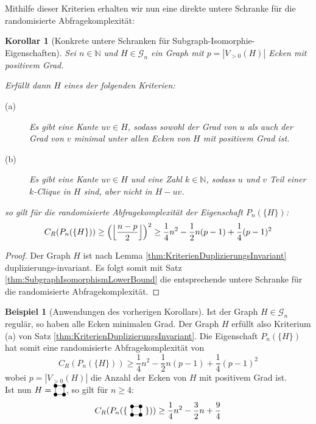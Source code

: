 \documentclass[10pt,a4paper, footheight=1mm]{scrreprt}
\newtheorem{corollary}[definition]{Korollar}
\theoremstyle{definition}
\newtheorem{examplex}{Beispiel}
\newenvironment{example}[1]
{ \begin{leftbar} \begin{examplex}#1}
{ \end{examplex} \ignorespacesafterend \end{leftbar} }
\newcommand{\Square}{
\begin{tikzpicture}[main_node/.style={circle,fill=black},
inner sep=1.5pt, baseline=2pt]

    \node[main_node] (1) at (0,0) {};
    \node[main_node] (2) at (0.35, 0)  {};
    \node[main_node] (3) at (0.35, 0.35) {};
    \node[main_node] (4) at (0, 0.35) {};

    \draw (1) -- (2) -- (3) -- (4) -- (1);
\end{tikzpicture}
}
\begin{document}
Mithilfe dieser Kriterien erhalten wir nun
eine direkte untere Schranke für die randomisierte Abfragekomplexität:
\begin{corollary}[Konkrete untere Schranken für Subgraph-Isomorphie-Eigenschaften]
Sei $n\in \mathbb{N}$ und $H\in \mathcal{G}_n$ ein Graph
mit $p=|V_{>0}(H)|$ Ecken mit positivem Grad.

Erfüllt dann $H$ eines der folgenden Kriterien:
\begin{description}
\item[(a)] Es gibt eine Kante $uv\in H$, sodass sowohl
           der Grad von $u$ als auch der Grad von $v$
           minimal unter allen Ecken von $H$ mit positivem
           Grad ist.
\item[(b)] Es gibt eine Kante $uv \in H$ und eine Zahl
           $k\in \mathbb{N}$, sodass $u$ und $v$
           Teil einer $k$-Clique in $H$ sind, aber nicht
           in $H-uv$.
\end{description}
so gilt für die randomisierte Abfragekomplexität der Eigenschaft 
$P_n(\{H\})$:
$$ C_R(P_n(\{H\})) \geq
\Big{ ( } \Big \lfloor  \frac{n-p}{2} \Big \rfloor \Big{)}^{2} \geq
\frac{1}{4}n^2 - \frac{1}{2}n(p-1) + \frac{1}{4}(p-1)^2
$$
\end{corollary}
\begin{proof}
Der Graph $H$ ist nach Lemma \ref{thm:KriterienDuplizierungsInvariant}
duplizierungs-invariant. Es folgt somit mit 
Satz \ref{thm:SubgraphIsomorphismLowerBound} die entsprechende
untere Schranke für die randomisierte Abfragekomplexität.
\end{proof}

\begin{example}[Anwendungen des vorherigen Korollars]
Ist der Graph $H\in\mathcal{G}_n$ regulär, so haben
alle Ecken minimalen Grad. Der Graph $H$ erfüllt also Kriterium (a)
von Satz \ref{thm:KriterienDuplizierungsInvariant}.
Die Eigenschaft $P_n(\{H\})$ hat somit eine randomisierte
Abfragekomplexität von 
$$ C_R(P_n(\{H\})) \geq
\frac{1}{4}n^2 - \frac{1}{2}n(p-1) + \frac{1}{4}(p-1)^2$$
wobei $p=|V_{>0}(H)|$ die Anzahl der Ecken von $H$ mit
positivem Grad ist. \\
Ist nun $H=\Square$, so gilt für $n\geq 4$:
$$ C_R(P_n(\{\ \Square \ \})) \geq
\frac{1}{4}n^2 - \frac{3}{2}n + \frac{9}{4}$$
\end{example}
\end{document}
